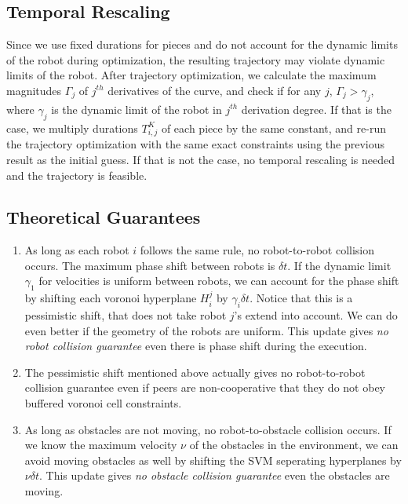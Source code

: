 \documentclass{svproc}
\begin{document}


\subsection{Temporal Rescaling} %
Since we use fixed durations for pieces and do not account for the dynamic limits of the robot during optimization, the resulting trajectory may violate dynamic limits of the robot. After trajectory optimization, we calculate the maximum magnitudes $\Gamma_j$ of $j^{th}$ derivatives of the curve, and check if for any $j$, $\Gamma_j > \gamma_j$, where $\gamma_j$ is the dynamic limit of the robot in $j^{th}$ derivation degree. If that is the case, we multiply durations $T^K_{i,j}$ of each piece by the same constant, and re-run the trajectory optimization with the same exact constraints using the previous result as the initial guess. If that is not the case, no temporal rescaling is needed and the trajectory is feasible.


\subsection{Theoretical Guarantees} %
\begin{enumerate}
    \item As long as each robot $i$ follows the same rule, no robot-to-robot collision occurs. The maximum phase shift between robots is $\delta t$. If the dynamic limit $\gamma_1$ for velocities is uniform between robots, we can account for the phase shift by shifting each voronoi hyperplane $H_i^j$ by $\gamma_i \delta t$. Notice that this is a pessimistic shift, that does not take robot $j$'s extend into account. We can do even better if the geometry of the robots are uniform. This update gives \emph{no robot collision guarantee} even there is phase shift during the execution.
    \item The pessimistic shift mentioned above actually gives no robot-to-robot collision guarantee even if peers are non-cooperative that they do not obey buffered voronoi cell constraints.
    \item As long as obstacles are not moving, no robot-to-obstacle collision occurs. If we know the maximum velocity $\nu$ of the obstacles in the environment, we can avoid moving obstacles as well by shifting the SVM seperating hyperplanes by $\nu \delta t $. This update gives \emph{no obstacle collision guarantee} even the obstacles are moving.
\end{enumerate}
\end{document}
